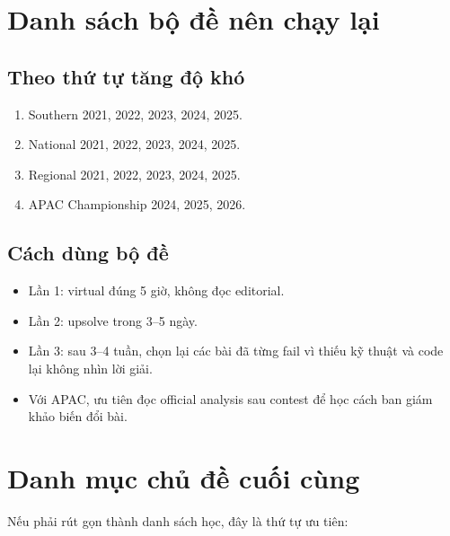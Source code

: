 \documentclass[11pt,a4paper]{article}
\begin{document}
\section{Danh sách bộ đề nên chạy lại}

\subsection{Theo thứ tự tăng độ khó}

\begin{enumerate}
  \item Southern 2021, 2022, 2023, 2024, 2025.
  \item National 2021, 2022, 2023, 2024, 2025.
  \item Regional 2021, 2022, 2023, 2024, 2025.
  \item APAC Championship 2024, 2025, 2026.
\end{enumerate}

\subsection{Cách dùng bộ đề}

\begin{itemize}
  \item Lần 1: virtual đúng 5 giờ, không đọc editorial.
  \item Lần 2: upsolve trong 3--5 ngày.
  \item Lần 3: sau 3--4 tuần, chọn lại các bài đã từng fail vì thiếu kỹ thuật và code lại không nhìn lời giải.
  \item Với APAC, ưu tiên đọc official analysis sau contest để học cách ban giám khảo biến đổi bài.
\end{itemize}

\section{Danh mục chủ đề cuối cùng}

Nếu phải rút gọn thành danh sách học, đây là thứ tự ưu tiên:
\end{document}
